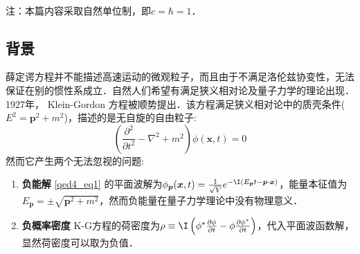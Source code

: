 \\注：本篇内容采取自然单位制，即$c=\hbar=1$．
\subsection{背景}
薛定谔方程并不能描述高速运动的微观粒子，而且由于不满足洛伦兹协变性，无法保证在别的惯性系成立．自然人们希望有满足狭义相对论及量子力学的理论出现．1927年， Klein-Gordon 方程被顺势提出．该方程满足狭义相对论中的质壳条件($E^{2}=\boldsymbol{p}^{2}+m^{2}$)，描述的是无自旋的自由粒子:
\begin{equation}\label{qed4_eq1}
\left(\frac{\partial^{2}}{\partial t^{2}}-\nabla^{2}+m^{2}\right) \phi(\boldsymbol{x}, t)=0
\end{equation}
然而它产生两个无法忽视的问题:

\begin{enumerate}
\item \textbf{负能解}
\autoref{qed4_eq1} 的平面波解为$\phi_{\boldsymbol{p}}(\boldsymbol{x}, t)=\frac{1}{\sqrt{V}} e^{- \I\left(E_{\boldsymbol{p}} t-\boldsymbol{p} \cdot \boldsymbol{x}\right)}$，能量本征值为
$E_{\boldsymbol{p}}=\pm \sqrt{\boldsymbol{p}^{2}+m^{2}}$，然而负能量在量子力学理论中没有物理意义．
\item \textbf{负概率密度}
K-G方程的荷密度为$\rho \equiv  \I\left(\phi^{*} \frac{\partial \phi}{\partial t}-\phi \frac{\partial \phi^{*}}{\partial t}\right)$，代入平面波函数解，显然荷密度可以取为负值．
\end{enumerate}
